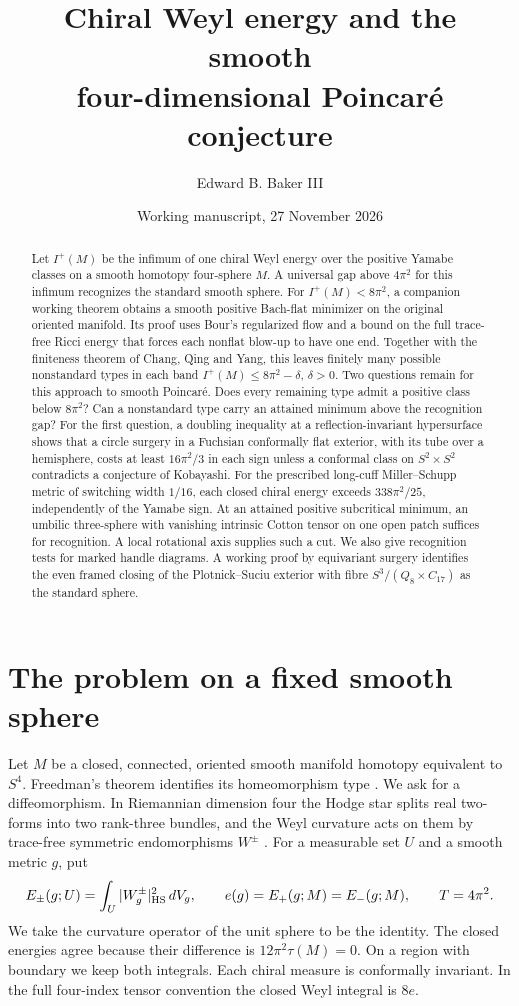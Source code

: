 \documentclass[11pt,letterpaper]{article}
\title{Chiral Weyl energy and the smooth\\four-dimensional Poincar\'e conjecture}
\author{Edward B. Baker III}
\date{Working manuscript, 27 November 2026}
\numberwithin{equation}{section}
\begin{document}
\maketitle
\begin{abstract}
Let \(I^+(M)\) be the infimum of one chiral Weyl energy over the positive
Yamabe classes on a smooth homotopy four-sphere \(M\). A universal gap
above \(4\pi^2\) for this infimum recognizes the standard smooth sphere.
For \(I^+(M)<8\pi^2\), a companion working theorem obtains a smooth
positive Bach-flat minimizer on the original oriented manifold. Its proof
uses Bour's regularized flow and a bound on the full trace-free Ricci
energy that forces each nonflat blow-up to have one end. Together with
the finiteness theorem of Chang, Qing and Yang, this leaves finitely
many possible nonstandard types in each band \(I^+(M)\le8\pi^2-\delta\),
\(\delta>0\). Two questions remain for this approach to smooth Poincar\'e.
Does every remaining type admit a positive class below \(8\pi^2\)?
Can a nonstandard type carry an attained minimum above the recognition
gap? For the first question, a doubling inequality at a
reflection-invariant hypersurface shows that a circle surgery in a
Fuchsian conformally flat exterior, with its tube over a hemisphere,
costs at least \(16\pi^2/3\) in each sign unless a conformal class on
\(S^2\times S^2\) contradicts a conjecture of Kobayashi.
For the prescribed long-cuff Miller--Schupp metric of switching width
\(1/16\), each closed chiral energy exceeds \(338\pi^2/25\), independently
of the Yamabe sign. At an attained positive subcritical minimum, an
umbilic three-sphere with vanishing intrinsic Cotton tensor on one
open patch suffices for recognition. A local rotational axis supplies
such a cut. We also give recognition tests for marked handle diagrams.
A working proof by equivariant surgery identifies the even framed
closing of the Plotnick--Suciu exterior with fibre
\(S^3/(Q_8\times C_{17})\) as the standard sphere.
\end{abstract}

\section{The problem on a fixed smooth sphere}

Let \(M\) be a closed, connected, oriented smooth manifold homotopy
equivalent to \(S^4\). Freedman's theorem identifies its homeomorphism
type \cite{Freedman1982}. We ask for a diffeomorphism. In Riemannian
dimension four the Hodge star splits real two-forms into two rank-three
bundles, and the Weyl curvature acts on them by trace-free symmetric
endomorphisms \(W^\pm\) \cite{AHS1978}. For a measurable set \(U\)
and a smooth metric \(g\), put
\[
 E_\pm(g;U)=\int_U|W^\pm_g|_{\rm HS}^2\,dV_g,\qquad
 e(g)=E_+(g;M)=E_-(g;M),\qquad T=4\pi^2 .
\]
We take the curvature operator of the unit sphere to be the identity.
The closed energies agree because their difference is \(12\pi^2\tau(M)=0\).
On a region with boundary we keep both integrals. Each chiral measure is
conformally invariant. In the full four-index tensor convention the closed
Weyl integral is \(8e\).
\end{document}

